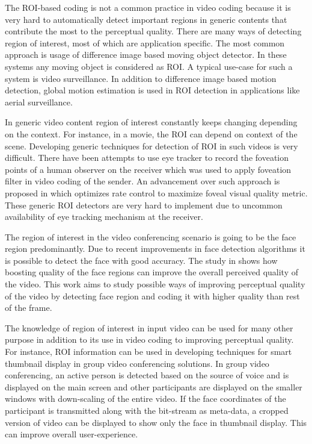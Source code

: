 \documentclass[11pt]{article} %
\begin{document}
The ROI-based coding is not a common practice in video coding because it is very hard to automatically detect important regions in generic contents that contribute the most to the perceptual quality. There are many ways of detecting region of interest, most of which are application specific. The most common approach is usage of difference image based moving object detector. In these systems any moving object is considered as ROI. A typical use-case for such a system is video surveillance. In addition to difference image based motion detection, global motion estimation is used in ROI detection \cite{ROI-aerial-surveillance} in applications like aerial surveillance.

In generic video content region of interest constantly keeps changing depending on the context. For instance, in a movie, the ROI can depend on context of the scene. Developing generic techniques for detection of ROI in such videos is very difficult. There have been attempts to use eye tracker to record the foveation points of a human observer on the receiver which was used to apply foveation filter in video coding of the sender. An advancement over such approach is proposed in \cite{foveated-rate-control} which optimizes rate control to maximize foveal visual quality metric. These generic ROI detectors are very hard to implement due to uncommon availability of eye tracking mechanism at the receiver. 

The region of interest in the video conferencing scenario is going to be the face region predominantly. Due to recent improvements in face detection algorithms it is possible to detect the face with good accuracy. The study in \cite{HighQualityROICodingForVideoConferencing} shows how boosting quality of the face regions can improve the overall perceived quality of the video. This work aims to study possible ways of improving perceptual quality of the video by detecting face region and coding it with higher quality than rest of the frame.

The knowledge of region of interest in input video can be used for many other purpose in addition to its use in video coding to improving perceptual quality. For instance, ROI information can be used in developing techniques for smart thumbnail display in group video conferencing solutions. In group video conferencing, an active person is detected based on the source of voice and is displayed on the main screen and other participants are displayed on the smaller windows with down-scaling of the entire video. If the face coordinates of the participant is transmitted along with the bit-stream as meta-data, a cropped version of video can be displayed to show only the face in thumbnail display. This can improve overall user-experience.
\end{document}
